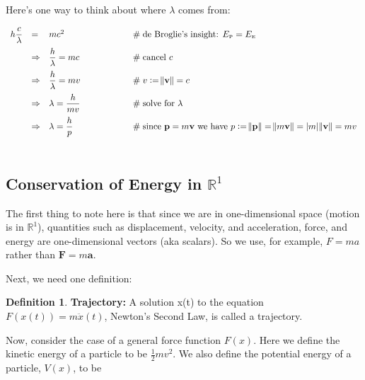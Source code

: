 \documentclass{article}
\theoremstyle{definition}
\newtheorem{definition}{Definition}[section]
\begin{document}
\smallskip
\bigskip
\noindent
Here's one way to think about where $\lambda$ comes from:

\begin{equation*}
\begin{array}{llll}
h \dfrac{c}{\lambda}
&=& mc^2	
			&\hspace{5em} \mathrel{\#} \text{de Broglie's insight: 
				$E_{\text{{\tiny P}}} = E_{\text{{\tiny E}}}$} \\
[9pt]
&\Rightarrow& \dfrac{h}{\lambda} = mc
			&\hspace{5em} \mathrel{\#} \text{cancel $c$} \\
[9pt]
&\Rightarrow& \dfrac{h}{\lambda} = mv
			&\hspace{5em} \mathrel{\#} v := \norm{\mathbf{v}} = c \\
[9pt]
&\Rightarrow& \lambda = \dfrac{h}{m v}
			&\hspace{5em} \mathrel{\#} \text{solve for $\lambda$}\\
[9pt]
&\Rightarrow& \lambda = \dfrac{h}{p}
			&\hspace{5em} \mathrel{\#} \text{since $\mathbf{p} = m \mathbf{v}$ 
			we have $p := \norm{\mathbf{p}}     = 
			              \norm{m \mathbf{v}}   = 
			              |m| \norm{\mathbf{v}} = 
			              mv$} \\
[22pt] 
\end{array}
\end{equation*}

\subsection{Conservation of Energy in $\mathbb{R}^{1}$}
\label{subsec:conservation_of_energy}
The first thing to note here is that since we are in one-dimensional
space (motion is in $\mathbb{R}^{1}$), quantities such as displacement,
velocity, and acceleration, force, and energy are one-dimensional 
vectors (aka scalars). So we use, for example, $F = ma$ rather than 
$\mathbf{F} = m \mathbf{a}$.


\bigskip
\noindent
Next, we need one definition:

\smallskip
\begin{definition}
{\bf Trajectory:} A solution x(t) to the equation $F(x(t)) = m \ddot{x}(t)$,
Newton’s Second Law, is called a trajectory.
\end{definition}

\smallskip
\noindent
Now, consider the case of a general force function $F(x)$. Here we define 
the kinetic energy of a particle to be $\frac{1}{2}mv^{2}$. We also 
define the potential energy of a particle, $V(x)$, to be 
\end{document}
